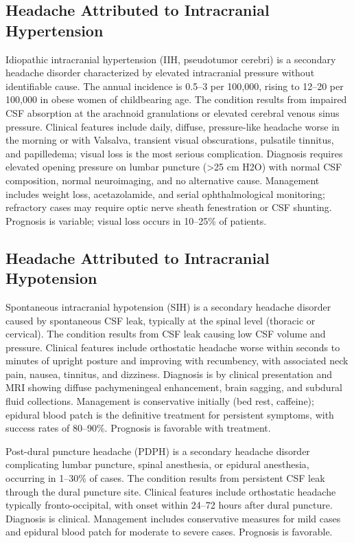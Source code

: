\subsection{Headache Attributed to Intracranial Hypertension}
\label{sec:Headache Intracranial Hypertension}
Idiopathic intracranial hypertension (IIH, pseudotumor cerebri) is a secondary headache disorder characterized by elevated intracranial pressure without identifiable cause. The annual incidence is 0.5--3 per 100,000, rising to 12--20 per 100,000 in obese women of childbearing age. The condition results from impaired CSF absorption at the arachnoid granulations or elevated cerebral venous sinus pressure. Clinical features include daily, diffuse, pressure-like headache worse in the morning or with Valsalva, transient visual obscurations, pulsatile tinnitus, and papilledema; visual loss is the most serious complication. Diagnosis requires elevated opening pressure on lumbar puncture (>25 cm H2O) with normal CSF composition, normal neuroimaging, and no alternative cause. Management includes weight loss, acetazolamide, and serial ophthalmological monitoring; refractory cases may require optic nerve sheath fenestration or CSF shunting. Prognosis is variable; visual loss occurs in 10--25\% of patients.

\subsection{Headache Attributed to Intracranial Hypotension}
\label{sec:Headache Intracranial Hypotension}
Spontaneous intracranial hypotension (SIH) is a secondary headache disorder caused by spontaneous CSF leak, typically at the spinal level (thoracic or cervical). The condition results from CSF leak causing low CSF volume and pressure. Clinical features include orthostatic headache worse within seconds to minutes of upright posture and improving with recumbency, with associated neck pain, nausea, tinnitus, and dizziness. Diagnosis is by clinical presentation and MRI showing diffuse pachymeningeal enhancement, brain sagging, and subdural fluid collections. Management is conservative initially (bed rest, caffeine); epidural blood patch is the definitive treatment for persistent symptoms, with success rates of 80--90\%. Prognosis is favorable with treatment.

Post-dural puncture headache (PDPH) is a secondary headache disorder complicating lumbar puncture, spinal anesthesia, or epidural anesthesia, occurring in 1--30\% of cases. The condition results from persistent CSF leak through the dural puncture site. Clinical features include orthostatic headache typically fronto-occipital, with onset within 24--72 hours after dural puncture. Diagnosis is clinical. Management includes conservative measures for mild cases and epidural blood patch for moderate to severe cases. Prognosis is favorable.

